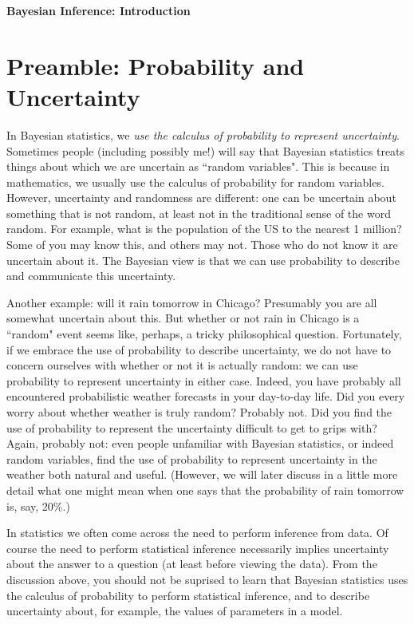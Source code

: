 \documentclass[times,11pt]{article}
\begin{document}

\begin{center}
\Large\bf Bayesian Inference: Introduction
\end{center}
\normalsize

\section*{Preamble: Probability and Uncertainty}

In Bayesian statistics, we {\it use the calculus of probability to represent uncertainty}.
Sometimes people (including possibly me!) will say that Bayesian statistics treats things about which we are uncertain as ``random variables".
This is because in mathematics, we usually use the calculus of probability for random variables.
However, uncertainty and randomness are different: one can be uncertain about something that
is not random, at least not in the traditional sense of the word random. For example, what is the
population of the US to the nearest 1 million? Some of you may know this, and others may not.
Those who do not know it are uncertain about it. The Bayesian view is that we can use probability to
describe and communicate this uncertainty.

Another example: will it rain tomorrow in Chicago? Presumably you are all somewhat uncertain about this.
But whether or not rain in Chicago
is a ``random" event seems like, perhaps, a tricky philosophical question. 
Fortunately, if we embrace the use of probability to describe uncertainty, we do not have to 
concern ourselves with whether or not it is actually random: we can use probability to represent uncertainty in either case.
Indeed, you have probably all encountered probabilistic weather forecasts in your day-to-day life. Did you every
worry about whether weather is truly random? Probably not. Did you find the use of probability to represent
the uncertainty difficult to get to grips with? Again, probably not: even people unfamiliar with Bayesian statistics,
or indeed random variables, find the use of probability to represent uncertainty in the weather both natural and useful.
(However, we will later discuss in a little more detail what one might mean when one says that the probability of rain tomorrow is, say, 20\%.)

In statistics we often come across the need to perform inference from data. Of course the need to perform statistical inference
necessarily implies uncertainty about the answer to a question (at least before viewing the data).
 From the discussion
above, you should not be suprised to learn that Bayesian statistics uses the calculus of probability to perform statistical inference,
and to describe uncertainty about, for example, the values of parameters in a model.
\end{document}
